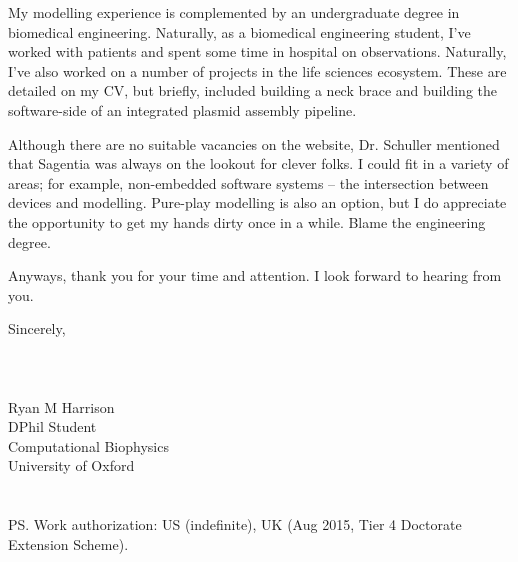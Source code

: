 \documentclass{../res}
\begin{document}
\begin{sloppypar}
\begin{resume}
My modelling experience is complemented by an undergraduate degree in biomedical engineering. Naturally, as a biomedical engineering student, I've worked with patients and spent some time in hospital on observations. Naturally, I've also worked on a number of projects in the life sciences ecosystem. These are detailed on my CV, but briefly, included building a neck brace and building the software-side of an integrated plasmid assembly pipeline.

Although there are no suitable vacancies on the website, Dr. Schuller mentioned that Sagentia was always on the lookout for clever folks. I could fit in a variety of areas; for example, non-embedded software systems -- the intersection between devices and modelling. Pure-play modelling is also an option, but I do appreciate the opportunity to get my hands dirty once in a while. Blame the engineering degree.

Anyways, thank you for your time and attention. I look forward to hearing from you.

\vspace{1\baselineskip}
Sincerely,
\\ \\ \\ \\
Ryan M Harrison \\ 
DPhil Student \\
Computational Biophysics \\
University of Oxford  \\ \\ \\
PS. Work authorization: US (indefinite), UK (Aug 2015, Tier 4 Doctorate Extension Scheme). \\ \\

\end{resume} 
\end{sloppypar}
\end{document}

